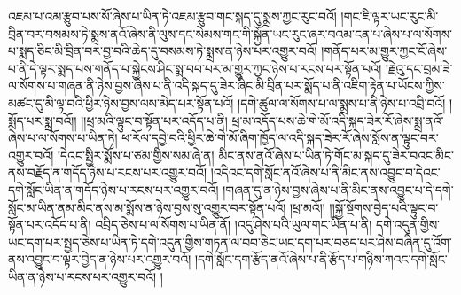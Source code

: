 འཇམ་པ་འམ་རྩུབ་པས་སོ་ཞེས་པ་ཡིན་ཏེ་འཇམ་རྩུབ་གང་སྐད་དུ་སྨྲས་ཀྱང་རུང་བའོ། །གང་ཇི་ལྟར་ཡང་རུང་མི་བྲིན་བར་བསམས་ཏེ་སྨྲས་ནའོ་ཞེས་ནི་ལུས་དང་སེམས་གང་གི་སྐྱོན་ཡང་རུང་ཞར་བའམ་ངན་པ་ཞེས་པ་ལ་སོགས་པ་སྨད་ཅིང་མི་བྲིན་བར་བྱ་བའི་ཆེད་དུ་བསམས་ཏེ་སྨྲས་ན་ཉེས་པར་འགྱུར་བའོ། །གནོད་པར་མ་གྱུར་ཀྱང་ངོ་ཞེས་པ་ནི་དེ་ལྟར་སྨད་པས་གནོད་པ་སྐྱེངས་ཤིང་སྨ་བབ་པར་མ་གྱུར་ཀྱང་ཉེས་པ་རངས་པར་སྟོན་པའོ། །རྗེའུ་དང་བྲམ་ཟེ་ལ་སོགས་པ་གཞན་ནི་ཉེས་བྱས་ཞེས་པ་ནི་འདི་སྐད་དུ་ཟེར་ཞིང་མི་བྲིན་པར་སྨོད་པ་ནི་འཇིག་རྟེན་པ་ཡོངས་ཀྱིས་མཚང་དུ་མི་ལྟ་བའི་ཕྱིར་ཉེས་བྱས་ལས་མེད་པར་སྟོན་པའོ། །དགེ་ཚུལ་ལ་སོགས་པ་ལ་སྨྲས་པ་ནི་ཉེས་པ་འབྲི་བའོ། །སྨོད་པར་སྨྲ་བའོ།། །།ཕྲ་མའི་ལྟུང་བ་སྟོན་པར་འདོད་པ་ནི། ཕྲ་མ་འདོད་པས་ཆེ་གེ་མོ་འདི་སྐད་ཟེར་རོ་ཞེས་སྨྲ་ནའོ་ཞེས་པ་ལ་སོགས་པ་ཡིན་ཏེ། ཕ་རོལ་དབྱེ་བའི་ཕྱིར་ཆེ་གེ་མོ་ཞིག་ཁྱོད་ལ་འདི་སྐད་ཟེར་རོ་ཞེས་སློས་ན་ལྟུང་བར་འགྱུར་བའོ། །དེའང་སྤྱིར་སྨོས་པ་ཙམ་གྱིས་སམ་ཞེ་ན། མིང་ནས་ནའོ་ཞེས་པ་ཡིན་ཏེ་གོང་མ་སྐད་དུ་ཟེར་བའང་མིང་ནས་བརྗོད་ན་གདོད་ཉེས་པ་རངས་པར་འགྱུར་བའོ། །འདིའང་དགེ་སློང་ནའོ་ཞེས་པ་ནི་མིང་ནས་འབྱུང་བ་དེའང་དགེ་སློང་ཡིན་ན་གདོད་ཉེས་པ་རངས་པར་འགྱུར་བའོ། །གཞན་དུ་ན་ཉེས་བྱས་ཞེས་པ་ནི་མིང་ནས་འབྱུང་པ་དེ་དགེ་སློང་མ་ཡིན་ནམ་མིང་ནས་མ་སྨོས་ན་ཉེས་བྱས་སུ་འགྱུར་བར་སྟོན་པའོ། །ཕྲ་མའོ།། །།སྐྱོ་སྔོགས་བྱེད་པའི་ལྟུང་བ་སྟོན་པར་འདོད་པ་ནི། འབྲིད་ཅེས་པ་ལ་སོགས་པ་ཡིན་ནོ། །འདུ་ཤེས་པའི་ཡུལ་གང་ཡིན་པ་ནི། དགེ་འདུན་གྱིས་ཡང་དག་པར་སྤྱད་ཅེས་པ་ཡིན་ཏེ་དགེ་འདུན་གྱིས་གཏན་ལ་བབ་ཅིང་ཡང་དག་པར་བཅད་པར་ཤེས་བཞིན་དུ་འོག་ནས་འབྱུང་བ་ལྟར་བྱེད་ན་ཉེས་པར་འགྱུར་བའོ། །དགེ་སློང་དག་རྩོད་ནའོ་ཞེས་པ་ནི་རྩོད་པ་གཉིས་ཀའང་དགེ་སློང་ཡིན་ན་ཉེས་པ་རངས་པར་འགྱུར་བའོ། །
